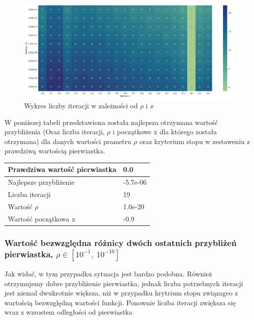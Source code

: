 \documentclass{article}
\begin{document}
\begin{figure}[H]
  \centering
  \begin{minipage}[b]{\textwidth}
    \includegraphics[width=\textwidth]{heatmap04.png}
  \end{minipage}
  \caption{Wykres liczby iteracji w zależności od \(\rho\) i \(x\)}
\end{figure}

\noindent
W poniższej tabeli przedstawiona została najlepsza otrzymana wartość przybliżenia (Oraz liczba iteracji, \(\rho\) i początkowe x dla którego została otrzymana) dla danych wartości prametru \(\rho\) oraz kryterium stopu w zestaweniu z prawdziwą wartością pierwiastka.

\begin{table}[H]
    \centering
    \begin{tabular}{|l|l|}
    \hline
        Prawdziwa wartość pierwiastka & 0.0 \\ \hline
        Najlepsze przybliżenie & -5.7e-06 \\ \hline
        Liczba iteracji & 19 \\ \hline
        Wartość $\rho$ & 1.0e-20 \\ \hline
        Wartość początkowa x & -0.9 \\ \hline
    \end{tabular}
\end{table}

\subsubsection{Wartość bezwzględna różnicy dwóch ostatnich przybliżeń pierwiastka, \(\rho \in [10^{-1}, \ 10^{-10}]\)}

Jak widać, w tym przypadku sytuacja jest bardzo podobna. Również otrzymujemy dobre przybliżenie pierwiastka, jednak liczba potrzebnych iteracji jest niemal dwukrotnie większa, niż w przypadku krytrium stopu związageo z wartością bezwzględną wartości funkcji. Ponownie liczba iteracji zwiększa się wraz z wzrostem odległości od pierwiastka
\end{document}
